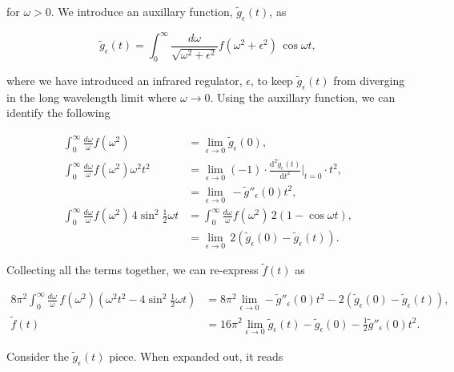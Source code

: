 \documentclass{article}
\numberwithin{equation}{section} %
\begin{document}
\noindent for $\omega>0$. We introduce an auxillary function, $\tilde{g}_\epsilon(t)$, as 

\begin{equation}
\tilde{g}_\epsilon(t) = \int^\infty_0 \frac{d\omega}{\sqrt{\omega^2 + \epsilon^2}} f(\omega^2 + \epsilon^2)\, \cos \omega t,
\label{aux func}
\end{equation}

\noindent where we have introduced an infrared regulator, $\epsilon$, to keep $\tilde{g}_\epsilon(t)$ from diverging in the long wavelength limit where $\omega\rightarrow 0$. Using the auxillary function, we can identify the following

\begin{equation}
\begin{split}
\int^\infty_0 \frac{d\omega}{\omega} f(\omega^2) &= \lim_{\epsilon\rightarrow 0} \tilde{g}_\epsilon(0),\\
\int^\infty_0 \frac{d\omega}{\omega} f(\omega^2)\omega^2 t^2 &= \lim_{\epsilon\rightarrow 0} (-1)\cdot\frac{\mathrm{d}^2\tilde{g}_\epsilon(t)}{\mathrm{d}t^2}\bigg\vert_{t=0} \cdot t^2,\\
&=\lim_{\epsilon\rightarrow 0} \, - \tilde{g}''_\epsilon(0)t^2,\\
\int^\infty_0 \frac{d\omega}{\omega} f(\omega^2)\,4 \sin^2 \frac{1}{2}\omega t &= \int^\infty_0 \frac{d\omega}{\omega} f(\omega^2)\,2(1- \cos\omega t) ,\\ 
&= \lim_{\epsilon\rightarrow 0}\, 2(\tilde{g}_\epsilon(0)-\tilde{g}_\epsilon(t)).
\end{split}
\end{equation}

\noindent Collecting all the terms together, we can re-express $\tilde{f}(t)$ as 

\begin{equation}
\begin{split}
8\pi^2\int^\infty_0 \frac{d\omega}{\omega}\, f(\omega^2)(\omega^2 t^2 - 4 \sin^2 \frac{1}{2}\omega t) &= 8\pi^2 \lim_{\epsilon\rightarrow 0} - \tilde{g}''_\epsilon(0)t^2 - 2(\tilde{g}_\epsilon(0)-\tilde{g}_\epsilon(t)),\\
\tilde{f}(t)&= 16\pi^2 \lim_{\epsilon\rightarrow 0}\tilde{g}_\epsilon(t) - \tilde{g}_\epsilon(0) - \frac{1}{2} \tilde{g}''_\epsilon(0)t^2.
\end{split}
\label{ftilde}
\end{equation}

Consider the $\tilde{g}_\epsilon(t)$ piece. When expanded out, it reads
\end{document}
